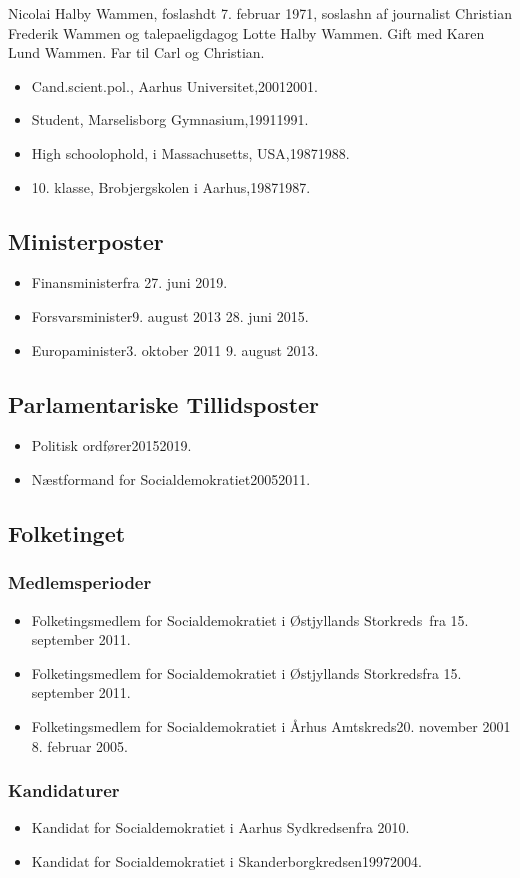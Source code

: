 \documentclass[11pt, a4paper]{awesome-cv}
\begin{document}
\makecvheader[R]
\makelettertitle
\begin{cvletter}
Nicolai Halby Wammen, foslashdt 7. februar 1971, soslashn af journalist Christian Frederik Wammen og talepaeligdagog Lotte Halby Wammen. Gift med Karen Lund Wammen. Far til Carl og Christian.

\begin{itemize}
\item Cand.scient.pol., Aarhus Universitet,20012001.
\item Student, Marselisborg Gymnasium,19911991.
\item High schoolophold, i Massachusetts, USA,19871988.
\item 10. klasse, Brobjergskolen i Aarhus,19871987.
\end{itemize}
\subsection*{Ministerposter}
\begin{itemize}
\item Finansministerfra 27. juni 2019.
\item Forsvarsminister9. august 2013  28. juni 2015.
\item Europaminister3. oktober 2011  9. august 2013.
\end{itemize}
\subsection*{Parlamentariske Tillidsposter}
\begin{itemize}
\item Politisk ordfører20152019.
\item Næstformand for Socialdemokratiet20052011.
\end{itemize}
\subsection*{Folketinget}
\subsubsection*{Medlemsperioder}
\begin{itemize}
\item Folketingsmedlem for Socialdemokratiet i Østjyllands Storkreds fra 15. september 2011.
\item Folketingsmedlem for Socialdemokratiet i Østjyllands Storkredsfra 15. september 2011.
\item Folketingsmedlem for Socialdemokratiet i Århus Amtskreds20. november 2001  8. februar 2005.
\end{itemize}
\subsubsection*{Kandidaturer}
\begin{itemize}
\item Kandidat for Socialdemokratiet i Aarhus Sydkredsenfra 2010.
\item Kandidat for Socialdemokratiet i Skanderborgkredsen19972004.
\end{itemize}
\end{cvletter}
\end{document}
